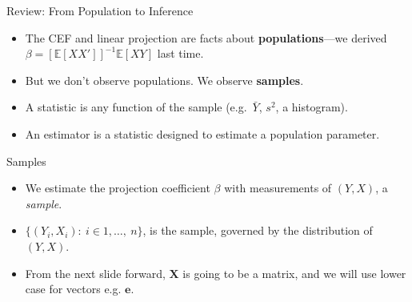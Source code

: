 \documentclass[aspectratio=169, handout]{beamer}
\numberwithin{equation}{section}
\begin{document}
\begin{frame}{Review: From Population to Inference}
\begin{itemize}
\item The CEF and linear projection are facts about \textbf{populations}---we derived $\beta=[\mathbb{E}[XX']]^{-1}\mathbb{E}[XY]$ last time.\pause
\item But we don't observe populations. We observe \textbf{samples}.\pause
\end{itemize}
\vspace{0.5em}
\begin{center}
\end{center}
\vspace{0.3em}
\begin{itemize}
\item A \alert{statistic} is any function of the sample (e.g.\ $\bar{Y}$, $s^2$, a histogram).
\item An \alert{estimator} is a statistic designed to estimate a population parameter.
\end{itemize}
\end{frame}

\begin{frame}{Samples}
\begin{itemize}
\item We estimate the projection coefficient $\beta$ with measurements of $(Y,X)$, a \emph{sample}.\pause
\item $\{(Y_i, X_i):\ i\in1,\ldots,\ n\}$, is the sample, governed by the distribution of $(Y,X)$.\pause
\item From the next slide forward, $\bm{X}$ is going to be a matrix, and we will use lower case for vectors e.g. $\bm{e}$.
\end{itemize}
\end{frame}
\end{document}
